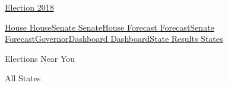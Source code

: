 \href{//www.nytimes.com}{}\href{https://www.nytimes.com/interactive/2018/us/elections/calendar-primary-results.html}{
Election 2018}

\href{https://www.nytimes.com/interactive/2018/11/06/us/elections/results-house-elections.html}{House
House}\href{https://www.nytimes.com/interactive/2018/11/06/us/elections/results-senate-elections.html}{Senate
Senate}\href{https://www.nytimes.com/interactive/2018/11/06/us/elections/results-house-forecast.html}{House
Forecast
Forecast}\href{https://www.nytimes.com/interactive/2018/11/06/us/elections/results-senate-forecast.html}{Senate
Forecast}\href{https://www.nytimes.com/interactive/2018/11/06/us/elections/results-governor-elections.html}{Governor}\href{https://www.nytimes.com/interactive/2018/11/06/us/elections/results-dashboard-live.html}{Dashboard
Dashboard}\protect\hyperlink{}{State Results States}

Elections Near You

All States

